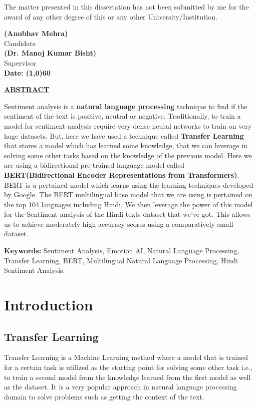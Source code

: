 \documentclass[a4paper, 12pt]{article}
\begin{document}
\begin{sloppypar}
The matter presented in this dissertation has not been submitted by me for the award of any other degree of this or any other University/Institution.
\vspace*{2cm}
\begin{flushright}
\textbf{(Anubhav Mehra)}\\
Candidate\\
\vspace*{2cm}
\textbf{(Dr. Manoj Kumar Bisht)}\\
Supervisor\\
\vspace*{1cm}
\textbf{Date: \line(1,0){60}}
\end{flushright}
\thispagestyle{empty}
\clearpage
\begin{center}
\textbf{\underline{ABSTRACT}} \\ [0.5ex]
\end{center}
 Sentiment analysis is a \textbf{natural language processing} technique to find if the sentiment of the text is positive, neutral or negative. Traditionally, to train a model for sentiment analysis require very dense neural networks to train on very huge datasets. But, here we have used a technique called \textbf{Transfer Learning} that stores a model which has learned some knowledge, that we can leverage in solving some other tasks based on the knowledge of the previous model. Here we are using a bidirectional pre-trained language model called  \textbf{BERT(Bidirectional Encoder Representations from Transformers)}. BERT is a pertained model which learns using the learning techniques developed by Google. The BERT multilingual base model that we are using is pertained on the top 104 languages including Hindi. We then leverage the power of this model for the Sentiment analysis of the Hindi texts dataset that we've got. This allows us to achieve moderately high accuracy scores using a comparatively small dataset.

\textbf{Keywords:} Sentiment Analysis, Emotion AI,  Natural Language Processing, Transfer Learning, BERT, Multilingual Natural Language Processing, Hindi Sentiment Analysis.
\thispagestyle{empty}
\clearpage
\tableofcontents
\thispagestyle{empty}
\clearpage
\setcounter{page}{1}
\section{Introduction}

\subsection{Transfer Learning}
Transfer Learning is a Machine Learning method where a model that is trained for a certain task is utilized as the starting point for solving some other task i.e., to train a second model from the knowledge learned from the first model as well as the dataset. It is a very popular approach in natural language processing domain to solve problems such as getting the context of the text.


\end{sloppypar}
\end{document}
